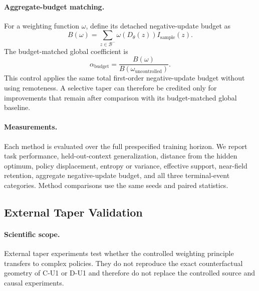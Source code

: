 \documentclass{article}
\theoremstyle{plain}
\theoremstyle{definition}
\theoremstyle{remark}
\begin{document}
\paragraph{Aggregate-budget matching.}
For a weighting function $\omega$, define its detached negative-update
budget as
\begin{equation}
    B(\omega)
    =
    \sum_{z\in\mathcal B^-}
    \omega(D_\theta(z))
    I_{\mathrm{sample}}(z).
    \label{eq:taper_budget}
\end{equation}
The budget-matched global coefficient is
\begin{equation}
    \alpha_{\mathrm{budget}}
    =
    \frac{
        B(\omega)
    }{
        B(\omega_{\mathrm{uncontrolled}})
    }.
    \label{eq:taper_global_match}
\end{equation}
This control applies the same total first-order negative-update budget
without using remoteness. A selective taper can therefore be credited
only for improvements that remain after comparison with its
budget-matched global baseline.

\paragraph{Measurements.}
Each method is evaluated over the full prespecified training horizon.
We report task performance, held-out-context generalization, distance
from the hidden optimum, policy displacement, entropy or variance,
effective support, near-field retention, aggregate negative-update
budget, and all three terminal-event categories. Method comparisons use
the same seeds and paired statistics.



\subsection{External Taper Validation}
\label{app:external_taper_protocol}

\paragraph{Scientific scope.}
External taper experiments test whether the controlled weighting
principle transfers to complex policies. They do not reproduce the exact
counterfactual geometry of C-U1 or D-U1 and therefore do not replace the
controlled source and causal experiments.
\end{document}
